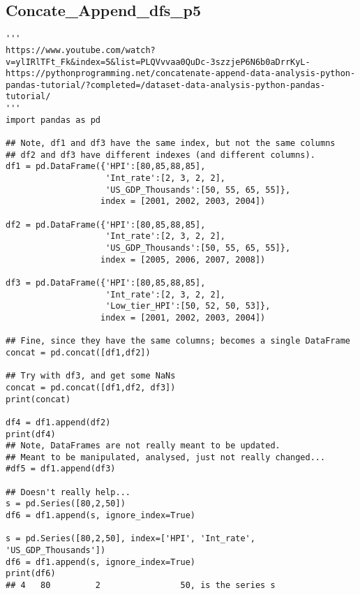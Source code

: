 \documentclass[11pt,a4paper]{article}
\begin{document}
\subsection{Concate\_Append\_dfs\_p5} 
\smallskip
\smallskip
\noindent 
\begin{lstlisting}
'''
https://www.youtube.com/watch?v=ylIRlTFt_Fk&index=5&list=PLQVvvaa0QuDc-3szzjeP6N6b0aDrrKyL-
https://pythonprogramming.net/concatenate-append-data-analysis-python-pandas-tutorial/?completed=/dataset-data-analysis-python-pandas-tutorial/
'''
import pandas as pd

## Note, df1 and df3 have the same index, but not the same columns
## df2 and df3 have different indexes (and different columns).
df1 = pd.DataFrame({'HPI':[80,85,88,85],
                    'Int_rate':[2, 3, 2, 2],
                    'US_GDP_Thousands':[50, 55, 65, 55]},
                   index = [2001, 2002, 2003, 2004])

df2 = pd.DataFrame({'HPI':[80,85,88,85],
                    'Int_rate':[2, 3, 2, 2],
                    'US_GDP_Thousands':[50, 55, 65, 55]},
                   index = [2005, 2006, 2007, 2008])

df3 = pd.DataFrame({'HPI':[80,85,88,85],
                    'Int_rate':[2, 3, 2, 2],
                    'Low_tier_HPI':[50, 52, 50, 53]},
                   index = [2001, 2002, 2003, 2004])

## Fine, since they have the same columns; becomes a single DataFrame
concat = pd.concat([df1,df2])

## Try with df3, and get some NaNs
concat = pd.concat([df1,df2, df3])
print(concat)

df4 = df1.append(df2)
print(df4)
## Note, DataFrames are not really meant to be updated. 
## Meant to be manipulated, analysed, just not really changed...
#df5 = df1.append(df3)

## Doesn't really help...
s = pd.Series([80,2,50])
df6 = df1.append(s, ignore_index=True)

s = pd.Series([80,2,50], index=['HPI', 'Int_rate', 'US_GDP_Thousands'])
df6 = df1.append(s, ignore_index=True)
print(df6)
## 4   80         2                50, is the series s
\end{lstlisting}
\clearpage
\end{document}
